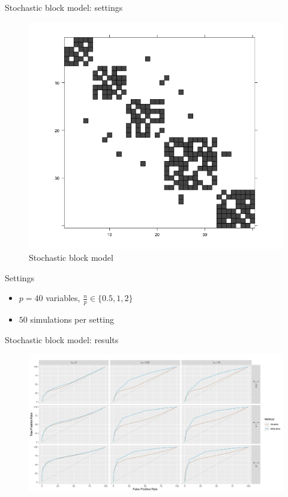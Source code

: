 \documentclass[11pt]{beamer}
\begin{document}
										\begin{frame}{Stochastic block model: settings}
											\begin{figure}
												\includegraphics[scale=0.15]{images/graph_stochastic_block.png}
												\caption{Stochastic block model}
											\end{figure}
											Settings
											\begin{itemize}
												\item $p=40$ variables, $\frac{n}{p}\in \{0.5,1,2\}$
												\item $50$ simulations per setting
											\end{itemize}
										\end{frame}
										
										\begin{frame}{Stochastic block model: results}
											\begin{figure}
												\includegraphics[scale=0.30]{images/fig-roc-sbm.png}
											\end{figure}
										\end{frame}
										
\end{document}
